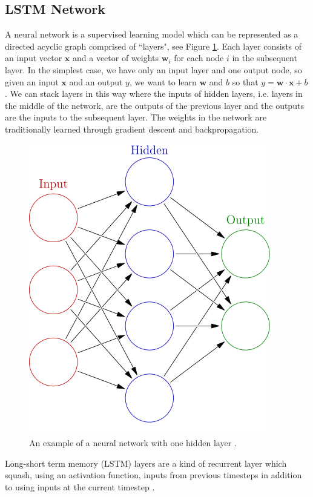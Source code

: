 \documentclass{article}
\begin{document}
\subsection{LSTM Network}

A neural network is a supervised learning model which can be represented as a
directed acyclic graph comprised of ``layers", see Figure \ref{fig:color_nn}. Each layer
consists of an input vector $\bm{x}$ and a vector of weights $\bm{w}_i$ for each
node $i$ in the subsequent layer. In the simplest case, we have only an input layer
and one output node, so given an input $\bm{x}$ and an output $y$, we want to learn
$\bm{w}$ and $b$ so that $y = \bm{w} \cdot \bm{x} + b$. We can stack layers in this way
where the inputs of hidden layers, i.e. layers in the middle of the network, are the
outputs of the previous layer and the outputs are the inputs to the subsequent layer.
The weights in the network are traditionally learned through gradient descent and 
backpropagation.

\begin{figure}[!ht]
    \centering
    \includegraphics[scale=.45]{Colored_neural_network.png}
    \caption{An example of a neural network with one hidden layer \cite{neuralnetwork}.}
    \label{fig:color_nn}
\end{figure}

Long-short term memory (LSTM) layers are a kind of recurrent layer which squash,
using an activation function, inputs from previous timesteps in addition
to using inputs at the current timestep \cite{lstm}.
\end{document}
